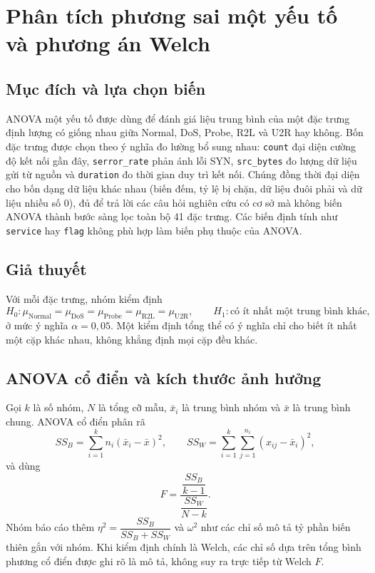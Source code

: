 \documentclass[../main.tex]{subfiles}
\begin{document}
\section{Phân tích phương sai một yếu tố và phương án Welch}
\label{sec:t33:method}

\subsection{Mục đích và lựa chọn biến}
ANOVA một yếu tố được dùng để đánh giá liệu trung bình của một đặc trưng định lượng có
giống nhau giữa Normal, DoS, Probe, R2L và U2R hay không. Bốn đặc trưng được chọn theo
ý nghĩa đo lường bổ sung nhau: \texttt{count} đại diện cường độ kết nối gần đây,
\texttt{serror\_rate} phản ánh lỗi SYN, \texttt{src\_bytes} đo lượng dữ liệu gửi từ
nguồn và \texttt{duration} đo thời gian duy trì kết nối. Chúng đồng thời đại diện cho
bốn dạng dữ liệu khác nhau (biến đếm, tỷ lệ bị chặn, dữ liệu đuôi phải và dữ liệu nhiều
số 0), đủ để trả lời các câu hỏi nghiên cứu có cơ sở mà không biến ANOVA thành bước sàng
lọc toàn bộ 41 đặc trưng. Các biến định tính như \texttt{service} hay \texttt{flag}
không phù hợp làm biến phụ thuộc của ANOVA.

\subsection{Giả thuyết}
Với mỗi đặc trưng, nhóm kiểm định
\[
H_0:\mu_{\mathrm{Normal}}=\mu_{\mathrm{DoS}}=\mu_{\mathrm{Probe}}
=\mu_{\mathrm{R2L}}=\mu_{\mathrm{U2R}},
\qquad
H_1:\text{có ít nhất một trung bình khác},
\]
ở mức ý nghĩa $\alpha=0{,}05$. Một kiểm định tổng thể có ý nghĩa chỉ cho biết ít nhất
một cặp khác nhau, không khẳng định mọi cặp đều khác.

\subsection{ANOVA cổ điển và kích thước ảnh hưởng}
Gọi $k$ là số nhóm, $N$ là tổng cỡ mẫu, $\bar x_i$ là trung bình nhóm và $\bar x$ là
trung bình chung. ANOVA cổ điển phân rã
\[
SS_B=\sum_{i=1}^{k}n_i(\bar x_i-\bar x)^2,\qquad
SS_W=\sum_{i=1}^{k}\sum_{j=1}^{n_i}(x_{ij}-\bar x_i)^2,
\]
và dùng
\[
F=\frac{\dfrac{SS_B}{k-1}}{\dfrac{SS_W}{N-k}}.
\]
Nhóm báo cáo thêm $\eta^2=\dfrac{SS_B}{SS_B+SS_W}$ và $\omega^2$ như các chỉ số mô
tả tỷ phần biến thiên gắn với nhóm. Khi kiểm định chính là Welch, các chỉ số dựa trên
tổng bình phương cổ điển được ghi rõ là mô tả, không suy ra trực tiếp từ Welch $F$.
\end{document}
